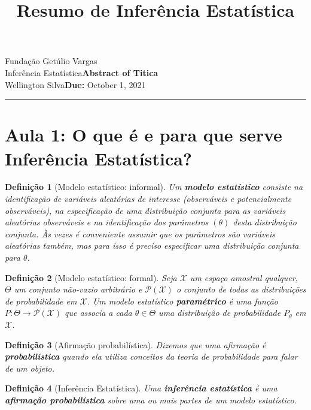 \documentclass{article}
\title{Resumo de Inferência Estatística}
\author{}
\date{}
\newtheorem{definition}{Definição}
\newcommand{\assignment}{Abstract of Titica}
\newcommand{\duedate}{October 1, 2021}
\begin{document}
Fundação Getúlio Vargas\hfill\\
Inferência Estatística\hfill\textbf{\assignment}\\
Wellington Silva\hfill\textbf{Due:} \duedate\\
\smallskip\hrule\bigskip

{\let\newpage\relax\maketitle}
\maketitle

\section*{Aula 1: O que é e para que serve Inferência Estatística?}

\begin{definition}[Modelo estatístico: informal]
Um \textbf{modelo estatístico} consiste na identificação de variáveis aleatórias de interesse (observáveis e potencialmente observáveis), na especificação de uma distribuição conjunta para as variáveis aleatórias observáveis e na identificação dos parâmetros $(\theta)$ desta distribuição conjunta. Às vezes é conveniente assumir que os parâmetros são variáveis aleatórias também, mas para isso é preciso especificar uma distribuição conjunta para $\theta$.
\end{definition}

\begin{definition}[Modelo estatístico: formal]
Seja $\mathcal{X}$ um espaço amostral qualquer, $\Theta$ um conjunto não-vazio arbitrário e $\mathcal{P(X)}$ o conjunto de todas as distribuições de probabilidade em $\mathcal{X}$. Um modelo estatístico \textbf{paramétrico} é uma função $P: \Theta \rightarrow \mathcal{P(X)}$ que associa a cada $\theta \in \Theta$ uma distribuição de probabilidade $P_\theta$ em $\mathcal{X}$.
\end{definition}

\begin{definition}[Afirmação probabilística]
Dizemos que uma afirmação é \textbf{probabilística} quando ela utiliza conceitos da teoria de probabilidade para falar de um objeto.
\end{definition}

\begin{definition}[Inferência Estatística]
Uma \textbf{inferência estatística} é uma \textbf{afirmação probabilística} sobre uma ou mais partes de um modelo estatístico.
\end{definition}
\end{document}
